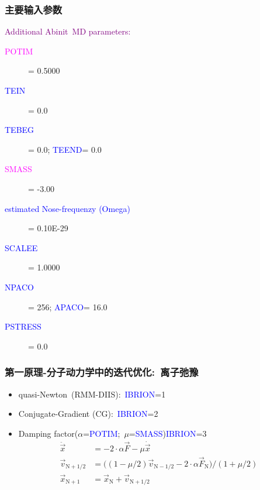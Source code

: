 \documentclass[cjk,slidestop,compress,mathserif,blue]{beamer}
\begin{document}
\frame
{
\frametitle{主要输入参数}
\textcolor{purple}{\textrm{Additional Abinit~MD parameters:~}}
	 \begin{description}
			 \item[\textcolor{magenta}{POTIM}]  = 0.5000 ~~\textcolor{brown}{\fontsize{9.2pt}{3.9pt}\selectfont{time-step for ionic-motion}}
			 \item[\textcolor{blue}{TEIN}]   = 0.0 ~~\textcolor{brown}{\fontsize{9.2pt}{3.9pt}\selectfont{initial temperature}}
			 \item[\textcolor{blue}{TEBEG}]  = 0.0; \textcolor{blue}{TEEND}= 0.0 ~~\textcolor{brown}{\fontsize{9.2pt}{3.9pt}\selectfont{temperature during run}}
			 \item[\textcolor{magenta}{SMASS}]  = -3.00 ~~\textcolor{brown}{\fontsize{9.2pt}{3.9pt}\selectfont{Nose mass-parameter (am)}}
			 \item[\textcolor{blue}{estimated Nose-frequenzy (Omega)}] = 0.10E-29 \\\textcolor{brown}{\fontsize{9.2pt}{3.9pt}\selectfont{period in steps =****** mass=  -0.192E-27a.u.}}
		 \item[\textcolor{blue}{SCALEE}] = 1.0000 ~~\textcolor{brown}{\fontsize{9.2pt}{3.9pt}\selectfont{scale energy and forces}}
		 \item[\textcolor{blue}{NPACO}]  = 256; \textcolor{blue}{APACO}= 16.0 ~~\textcolor{brown}{\fontsize{9.2pt}{3.9pt}\selectfont{distance and # of slots for P.C.}}
		\item[\textcolor{blue}{PSTRESS}]= 0.0 ~~\textcolor{brown}{\fontsize{9.2pt}{3.9pt}\selectfont{pullay stress}}
	 \end{description}
   }

   \frame
   {
	   \frametitle{第一原理-分子动力学中的迭代优化:~离子弛豫}
	\begin{itemize}
		   \item \textrm{quasi-Newton~(RMM-DIIS)}:~\textcolor{blue}{IBRION}=1\\
			
		   \item \textrm{Conjugate-Gradient (CG)}:~\textcolor{blue}{IBRION}=2\\
			
		   \item \textrm{Damping factor($\alpha$=\textcolor{blue}{POTIM};~$\mu$=\textcolor{blue}{SMASS})}\textcolor{blue}{IBRION}=3
			   \begin{displaymath}
				   \begin{aligned}
				   	\ddot{\vec x}&=-2\cdot\alpha\vec F-\mu\dot{\vec x}\\
					\vec v_{\mathrm{N+1/2}}&=\bigg((1-\mu/2)\vec v_{\mathrm{N}-1/2}-2\cdot\alpha\vec F_{\mathrm{N}}\bigg)/(1+\mu/2)\\
					\vec x_{\mathrm{N+1}}&=\vec x_{\mathrm{N}}+\vec v_{\mathrm{N}+1/2}
				   \end{aligned}
			   \end{displaymath}
	\end{itemize}
   }
\end{document}
